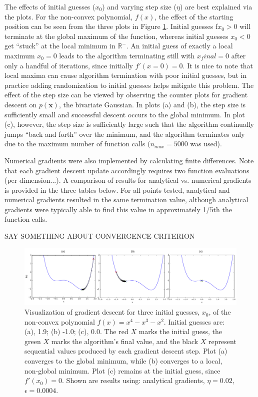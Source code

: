 \documentclass{article}
\begin{document}
The effects of initial guesses ($x_0$) and varying step size ($\eta$) are best explained via the plots.  For the non-convex polynomial, $f(x)$, the effect of the starting position can be seen from the three plots in Figure \ref{poly}.  Initial guesses f$x_0 > 0$ will terminate at the global maximum of the function, whereas initial guesses $x_0 < 0$ get ``stuck'' at the local minimum in $\mathbb{R}^-$.  An initial guess of exactly a local maximum $x_0 = 0$ leads to the algorithm terminating still with $x_final = 0$ after only a handful of iterations, since initially $f'(x=0)=0$.  It is nice to note that local maxima can cause algorithm termination with poor initial guesses, but in practice adding randomization to initial guesses helps mitigate this problem.  The effect of the step size can be viewed by observing the counter plots for gradient descent on $p(\mathbf{x})$, the bivariate Gaussian.  In plots (a) and (b), the step size is sufficiently small and successful descent occurs to the global minimum.  In plot (c), however, the step size is sufficiently large such that the algorithm continually jumps ``back and forth'' over the minimum, and the algorithm terminates only due to the maximum number of function calls ($n_{max}=5000$ was used).

Numerical gradients were also implemented by calculating finite differences.  Note that each gradient descent update accordingly requires two function evaluations (per dimension...).  A comparison of results for analytical vs. numerical gradients is provided in the three tables below.  For all points tested, analytical and numerical gradients resulted in the same termination value, although analytical gradients were typically able to find this value in approximately 1/5th the function calls.

SAY SOMETHING ABOUT CONVERGENCE CRITERION




\begin{figure}[!ht]
\centering
\includegraphics[scale=0.9]{polynomialdescent.pdf}
\caption{Visualization of gradient descent for three initial guesses, $x_0$, of the non-convex polynomial $f(x) = x^4 - x^3 -x^2$.  Initial guesses are: (a), 1.9; (b) -1.0; (c), 0.0.  The red $X$ marks the initial guess, the green $X$ marks the algorithm's final value, and the black $X$ represent sequential values produced by each gradient descent step. Plot (a) converges to the global minimum, while (b) converges to a local, non-global minimum.  Plot (c) remains at the initial guess, since $f'(x_0)=0$. Shown are results using: analytical gradients, $\eta = 0.02$, $\epsilon = 0.0004$.}
\label{poly}
\end{figure}
\end{document}
